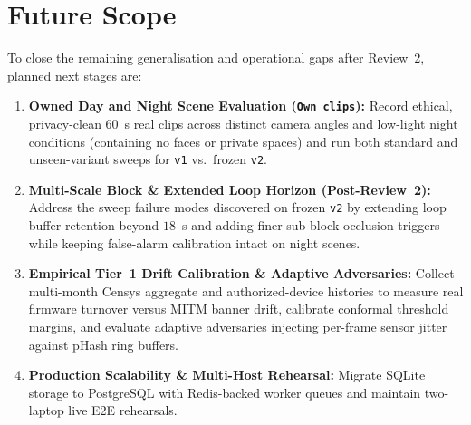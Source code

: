 \section{Future Scope}
To close the remaining generalisation and operational gaps after Review~2, planned next stages are:
\begin{enumerate}
  \item \textbf{Owned Day and Night Scene Evaluation (\texttt{Own clips}):} Record ethical, privacy-clean $60$~s real clips across distinct camera angles and low-light night conditions (containing no faces or private spaces) and run both standard and unseen-variant sweeps for \texttt{v1} vs.\ frozen \texttt{v2}.
  \item \textbf{Multi-Scale Block \& Extended Loop Horizon (Post-Review~2):} Address the sweep failure modes discovered on frozen \texttt{v2} by extending loop buffer retention beyond $18$~s and adding finer sub-block occlusion triggers while keeping false-alarm calibration intact on night scenes.
  \item \textbf{Empirical Tier~1 Drift Calibration \& Adaptive Adversaries:} Collect multi-month Censys aggregate and authorized-device histories to measure real firmware turnover versus MITM banner drift, calibrate conformal threshold margins, and evaluate adaptive adversaries injecting per-frame sensor jitter against pHash ring buffers.
  \item \textbf{Production Scalability \& Multi-Host Rehearsal:} Migrate SQLite storage to PostgreSQL with Redis-backed worker queues and maintain two-laptop live E2E rehearsals.
\end{enumerate}
